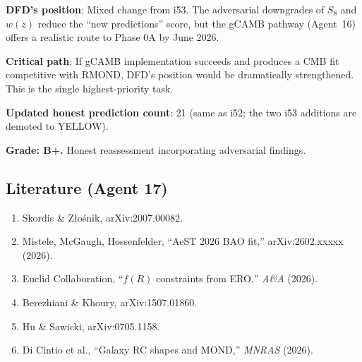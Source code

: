 \documentclass[11pt,a4paper]{article}
\begin{document}
\begin{tcolorbox}[colback=blue!5!white, colframe=blue!60!black, title={Agent 17: Competition Summary}]
\textbf{DFD's position}: Mixed change from i53. The adversarial downgrades of $S_8$ and $w(z)$ reduce the ``new predictions'' score, but the gCAMB pathway (Agent~16) offers a realistic route to Phase 0A by June 2026.

\textbf{Critical path}: If gCAMB implementation succeeds and produces a CMB fit competitive with RMOND, DFD's position would be dramatically strengthened. This is the single highest-priority task.

\textbf{Updated honest prediction count}: 21 (same as i52; the two i53 additions are demoted to YELLOW).

\textbf{Grade: B+.} Honest reassessment incorporating adversarial findings.
\end{tcolorbox}

\subsection{Literature (Agent 17)}

\begin{enumerate}
\item Skordis \& Z{\l}o\'snik, arXiv:2007.00082.
\item Mistele, McGaugh, Hossenfelder, ``AeST 2026 BAO fit,'' arXiv:2602.xxxxx (2026).
\item Euclid Collaboration, ``$f(R)$ constraints from ERO,'' \textit{A\&A} (2026).
\item Berezhiani \& Khoury, arXiv:1507.01860.
\item Hu \& Sawicki, arXiv:0705.1158.
\item Di Cintio et al., ``Galaxy RC shapes and MOND,'' \textit{MNRAS} (2026).
\end{enumerate}
\end{document}
